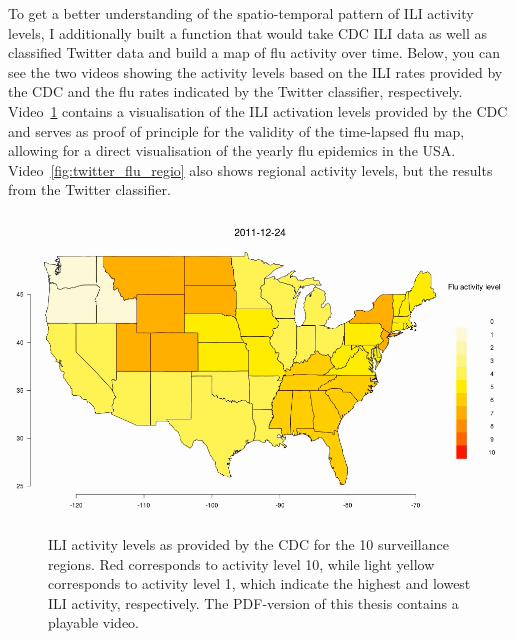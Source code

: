 \documentclass[11pt, a4paper,twoside]{report}\usepackage[]{graphicx}\usepackage[]{color}
\begin{document}
To get a better understanding of the spatio-temporal pattern of ILI activity levels, I additionally built a function that would take CDC ILI data as well as classified Twitter data and build a map of flu activity over time. Below, you can see the two videos showing the activity levels based on the ILI rates provided by the CDC and the flu rates indicated by the Twitter classifier, respectively. Video~\ref{fig:cdc_flu_regio} contains a visualisation of the ILI activation levels provided by the CDC and serves as proof of principle for the validity of the time-lapsed flu map, allowing for a direct visualisation of the yearly flu epidemics in the USA. Video~\ref{fig:twitter_flu_regio} also shows regional activity levels, but the results from the Twitter classifier. 

\begin{center}
\href{run:vids/1_cdc_flu_regio.avi}{\includegraphics[width=0.9\linewidth]{vids/1_cdc_flu_regio.png}}
\end{center}
\begin{figure}[H]
\centering
  \caption{ILI activity levels as provided by the CDC for the 10 surveillance regions. Red corresponds to activity level 10, while light yellow corresponds to activity level 1, which indicate the highest and lowest ILI activity, respectively. The PDF-version of this thesis contains a playable video.}
    \label{fig:cdc_flu_regio}
\end{figure}
\end{document}
